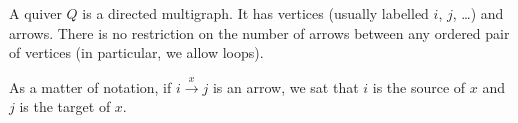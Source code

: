 A quiver $Q$ is a directed multigraph. It has vertices (usually labelled
$i$, $j$, \ldots) and arrows. There is no restriction on the number of arrows
between any ordered pair of vertices (in particular, we allow loops).

As a matter of notation, if $i\stackrel{x}{\longrightarrow} j$ is an arrow,
we sat that  $i$ is the source of $x$ and $j$ is the target of $x$.
